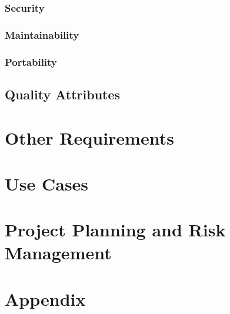 \documentclass[11pt,a4paper]{article}
\begin{document}
\subsubsection{Security}

\subsubsection{Maintainability}

\subsubsection{Portability}

\subsection{Quality Attributes}

\section{Other Requirements}

\section {Use Cases}

\section{Project Planning and Risk Management}

\appendix
\section{Appendix}
\end{document}
